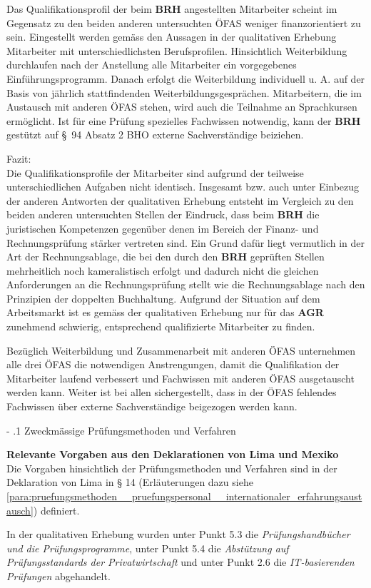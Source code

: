 \documentclass[10pt]{article}
\makeatletter
\renewcommand\subparagraph{\@startsection{subparagraph}{4}{0mm}{-\baselineskip}{.1\baselineskip}{\normalfont\normalsize\bfseries}}
\renewcommand\subparagraph{%
\@startsection{subparagraph}{4}{0mm}%
{-\baselineskip}%
{.1\baselineskip}%
{\normalfont\normalsize\bfseries}}
\makeatother
\begin{document}
Das Qualifikationsprofil der beim \textbf{BRH} angestellten Mitarbeiter scheint im Gegensatz zu den beiden anderen untersuchten ÖFAS weniger finanzorientiert zu sein. Eingestellt werden gemäss den Aussagen in der qualitativen Erhebung Mitarbeiter mit unterschiedlichsten Berufsprofilen. Hinsichtlich Weiterbildung durchlaufen nach der Anstellung alle Mitarbeiter ein vorgegebenes Einführungsprogramm. Danach erfolgt die Weiterbildung individuell u. A. auf der Basis von jährlich stattfindenden Weiterbildungs­gesprächen. Mitarbeitern, die im Austausch mit anderen ÖFAS stehen, wird auch die Teilnahme an Sprachkursen ermöglicht. Ist für eine Prüfung spezielles Fachwissen notwendig, kann der \textbf{BRH} gestützt auf §~94 Absatz 2 BHO externe Sachverständige beiziehen.

Fazit:\\
Die Qualifikationsprofile der Mitarbeiter sind aufgrund der teilweise unterschiedlichen Aufgaben nicht identisch. Insgesamt bzw. auch unter Einbezug der anderen Antworten der qualitativen Erhebung entsteht im Vergleich zu den beiden anderen untersuchten Stellen der Eindruck, dass beim \textbf{BRH} die juristischen Kompetenzen gegenüber denen im Bereich der Finanz- und Rechnungsprüfung stärker vertreten sind. Ein Grund dafür liegt vermutlich in der Art der Rechnungsablage, die bei den durch den \textbf{BRH }geprüften Stellen mehrheitlich noch kameralistisch erfolgt und dadurch nicht die gleichen Anforderungen an die Rechnungsprüfung stellt wie die Rechnungsablage nach den Prinzipien der doppelten Buchhaltung. Aufgrund der Situation auf dem Arbeitsmarkt ist es gemäss der qualitativen Erhebung nur für das \textbf{AGR} zunehmend schwierig, entsprechend qualifizierte Mitarbeiter zu finden.

Bezüglich Weiterbildung und Zusammenarbeit mit anderen ÖFAS unternehmen alle drei ÖFAS die notwendigen Anstrengungen, damit die Qualifikation der Mitarbeiter laufend verbessert und Fachwissen mit anderen ÖFAS ausgetauscht werden kann. Weiter ist bei allen sichergestellt, dass in der ÖFAS fehlendes Fachwissen über externe Sachverständige beigezogen werden kann.

\subparagraph{Zweckmässige Prüfungsmethoden und Verfahren}\label{subpara:zweckmaessige_pruefungsmethoden_und_verfahren}
\begin{shaded}
\textbf{Relevante Vorgaben aus den Deklarationen von Lima und Mexiko}\\
Die Vorgaben hinsichtlich der Prüfungsmethoden und Verfahren sind in der Deklaration von Lima in § 14 (Erläuterungen dazu siehe \vref{para:pruefungsmethoden__pruefungspersonal__internationaler_erfahrungsaustausch}) definiert.

\end{shaded}
In der qualitativen Erhebung wurden unter Punkt 5.3 die \textit{Prüfungshandbücher und die Prüfungsprogramme}, unter Punkt 5.4 die \textit{Abstützung auf Prüfungsstandards der Privatwirtschaft }und unter Punkt 2.6 die \textit{IT-basierenden Prüfungen} abgehandelt.
\end{document}
